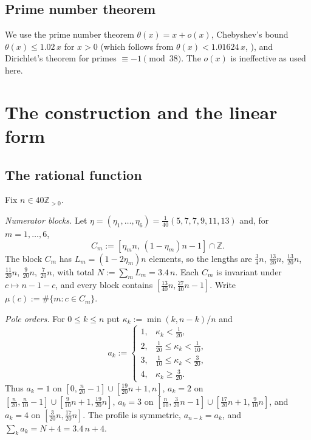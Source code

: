 \documentclass{amsart}
\theoremstyle{definition}
\theoremstyle{remark}
\numberwithin{equation}{section}
\newcommand{\Z}{\mathbb{Z}}
\begin{document}
\subsection{Prime number theorem}\label{ss:pnt}

We use the prime number theorem $\theta(x)=x+o(x)$, Chebyshev's bound
$\theta(x)\le1.02\,x$ for $x>0$ (which follows from
$\theta(x)<1.01624\,x$, \cite[Theorem~9]{RS62}), and Dirichlet's theorem for
primes $\equiv-1\pmod{38}$. The $o(x)$ is ineffective as used here.

\section{The construction and the linear form}\label{sec:construction}

\subsection{The rational function}\label{ss:construction}

Fix $n\in40\Z_{>0}$.

\emph{Numerator blocks.} Let
$\eta=(\eta_1,\dots,\eta_6)=\frac1{40}(5,7,7,9,11,13)$ and, for
$m=1,\dots,6$,
\[
  C_m:=[\eta_mn,\,(1-\eta_m)n-1]\cap\Z .
\]
The block $C_m$ has $L_m=(1-2\eta_m)n$ elements, so the lengths are
$\frac34n$, $\frac{13}{20}n$, $\frac{13}{20}n$, $\frac{11}{20}n$,
$\frac9{20}n$, $\frac7{20}n$, with total $N:=\sum_mL_m=3.4\,n$. Each $C_m$ is
invariant under $c\mapsto n-1-c$, and every block contains
$[\frac{13}{40}n,\frac{27}{40}n-1]$. Write $\mu(c):=\#\{m:c\in C_m\}$.

\emph{Pole orders.} For $0\le k\le n$ put $\kappa_k:=\min(k,n-k)/n$ and
\[
  a_k:=\begin{cases}1,&\kappa_k<\frac1{20},\\ 2,&\frac1{20}\le\kappa_k<\frac1{10},\\
  3,&\frac1{10}\le\kappa_k<\frac3{20},\\ 4,&\kappa_k\ge\frac3{20}.\end{cases}
\]
Thus $a_k=1$ on $[0,\frac n{20}-1]\cup[\frac{19}{20}n+1,n]$, $a_k=2$ on
$[\frac n{20},\frac n{10}-1]\cup[\frac9{10}n+1,\frac{19}{20}n]$, $a_k=3$ on
$[\frac n{10},\frac{3}{20}n-1]\cup[\frac{17}{20}n+1,\frac9{10}n]$, and $a_k=4$
on $[\frac3{20}n,\frac{17}{20}n]$. The profile is symmetric, $a_{n-k}=a_k$, and
$\sum_ka_k=N+4=3.4\,n+4$.
\end{document}
